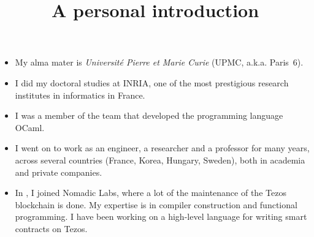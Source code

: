 \documentclass[wide]{slides}
\begin{document}
\maketitle

\begin{slide}
  \title{A personal introduction}

  \begin{itemize}

    \item My alma mater is \emph{Universit\'e Pierre et Marie Curie}
      (UPMC, a.k.a. Paris~6).

    \item I did my doctoral studies at INRIA, one of the most
      prestigious research institutes in informatics in France.

    \item I was a member of the team that developed the programming
      language OCaml.

    \item I went on to work as an engineer, a researcher and a
      professor for many years, across several countries (France,
      Korea, Hungary, Sweden), both in academia and private
      companies.

    \item In , I joined Nomadic Labs, where a lot
      of the maintenance of the Tezos blockchain is done. My expertise
      is in compiler construction and functional programming. I have
      been working on a high-level language for writing smart
      contracts on Tezos.

  \end{itemize}

\end{slide}
\end{document}
